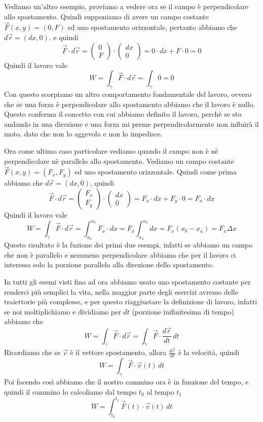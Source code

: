 \documentclass{rapport}
\begin{document}
Vediamo un'altro esempio, proviamo a vedere ora se il campo è perpendicolare allo spostamento. Quindi supponiamo di avere un campo costante $\vec{F}(x,y) = (0, F)$ ed uno spostamento orizzontale, pertanto abbiamo che $d\vec{r} = (dx, 0)$. e quindi 
\[
\vec{F} \cdot d\vec{r} = \begin{pmatrix}
  0 \\
  F
\end{pmatrix} \cdot \begin{pmatrix}
  dx \\
  0
\end{pmatrix}
= 0 \cdot dx + F \cdot 0 = 0
\]
Quindi il lavoro vale 
\[
W = \int_{\gamma} \vec{F} \cdot d\vec{r} =  \int_{\gamma} 0 = 0
\]
Con questo scorpiamo un altro comportamento fondamentale del lavoro, ovvero che se una forza è perpendicolare allo spostamento abbiamo che il lavoro è nullo. Questo conferma il concetto con cui abbiamo definito il lavoro, perchè se sto andando in una direzione e una forza mi preme perpendicolarmente non influirà il moto, dato che non lo aggevola e non lo impedisce. 

Ora come ultimo caso particolare vediamo quando il campo non è nè perpendicolare nè parallelo allo spostamento. Vediamo un campo costante $\vec{F}(x,y) = (F_x, F_y)$ ed uno spostamento orizzontale. Quindi come prima abbiamo che  $d\vec{r} = (dx, 0)$, quindi
\[
\vec{F} \cdot d\vec{r} = \begin{pmatrix}
  F_x \\
  F_y
\end{pmatrix} \cdot \begin{pmatrix}
  dx \\
  0
\end{pmatrix}
= F_x \cdot dx + F_y \cdot 0 = F_x \cdot dx
\]
Quindi il lavoro vale 
\[
W = \int_{\gamma} \vec{F} \cdot d\vec{r} =  \int_{x_a}^{x_b} F_x \cdot dx =  F_x\int_{x_a}^{x_b}  dx = F_x (x_b-x_a) = F_x\Delta x
\]
Questo risultato è la fuzione dei primi due esempi, infatti se abbiamo un campo che non è parallelo e nemmeno perpendicolare abbiamo che per il lavoro ci interessa solo la porzione parallela alla direzione dello spostamento. 

In tutti gli esemi visti fino ad ora abbiamo usato uno spostamento costante per renderci più semplici la vita, nella maggior parte degli esercizi avremo delle traiettorie più complesse, e per questo riaggiustare la definizione di lavoro, infatti se noi moltiplichiamo e dividiamo per $dt$ (porzione inifinitesima di tempo) abbiamo che 
\[
W = \int_{\gamma} \vec{F} \cdot d\vec{r}   = \int_{\gamma} \vec{F} \cdot \dfrac{d\vec{r}}{dt} \,dt
\]
Ricordiamo che se $\vec{r}$ è il vettore spostamento, allora $\frac{d\vec{r}}{dt}$ è la velocità, quindi 
\[
W = \int_{\gamma} \vec{F} \cdot \vec{v}(t) \,dt
\]
Poi facendo così abbiamo che il nostro cammino ora è in funzione del tempo, e quindi il cammino lo calcoliamo dal tempo $t_0$ al tempo $t_1$
\[
W = \int_{t_0}^{t_1} \vec{F}(t) \cdot \vec{v}(t) \,dt
\]
\end{document}
